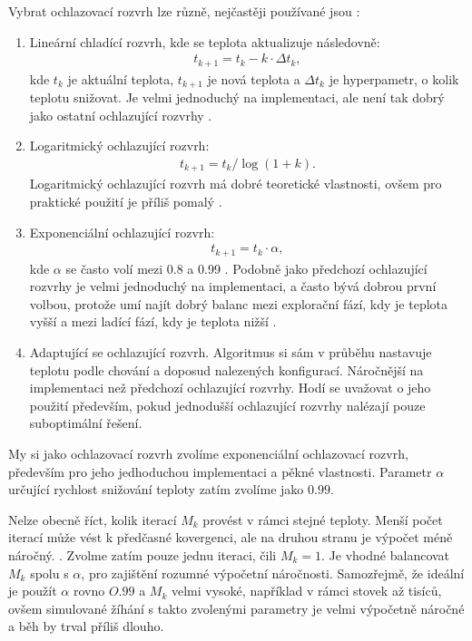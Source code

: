 Vybrat ochlazovací rozvrh lze různě, nejčastěji používané jsou \cite{sa_theory}:
\begin{enumerate}
  \item Lineární chladící rozvrh, kde se teplota aktualizuje následovně:
    \begin{align*}
      t_{k+1} = t_k - k \cdot \Delta t_k,
    \end{align*}
    kde $t_k$ je aktuální teplota, $t_{k+1}$ je nová teplota a $\Delta t_k$ je hyperpametr, o kolik teplotu snižovat.
    Je velmi jednoduchý na implementaci, ale není tak dobrý jako ostatní ochlazující rozvrhy \cite{sa_schedules}.

  \item Logaritmický ochlazující rozvrh:
    \begin{align*}
      t_{k+1} = t_{k} / \log(1 + k).
    \end{align*}
    Logaritmický ochlazující rozvrh má dobré teoretické vlastnosti, ovšem pro praktické použití je příliš pomalý \cite{sa_schedules}.

  \item Exponenciální ochlazující rozvrh:
    \begin{align*}
      t_{k+1} = t_k \cdot \alpha,
    \end{align*}
    kde $\alpha$ se často volí mezi 0.8 a 0.99 \cite{sa_theory}.
    Podobně jako předchozí ochlazující rozvrhy je velmi jednoduchý na implementaci, a často bývá dobrou první volbou, protože umí najít dobrý balanc mezi explorační fází,
    kdy je teplota vyšší a mezi ladící fází, kdy je teplota nižší \cite{sa_theory}.

  \item Adaptující se ochlazující rozvrh. Algoritmus si sám v průběhu nastavuje teplotu podle chování a doposud nalezených konfigurací.
    Náročnější na implementaci než předchozí ochlazující rozvrhy. Hodí se uvažovat o jeho použití především, pokud jednodušší ochlazující rozvrhy nalézají pouze suboptimální řešení.
\end{enumerate}

My si jako ochlazovací rozvrh zvolíme exponenciální ochlazovací rozvrh, především pro jeho jedhoduchou implementaci a pěkné vlastnosti.
Parametr $\alpha$ určující rychlost snižování teploty zatím zvolíme jako $0.99$.

Nelze obecně říct, kolik iterací $M_k$ provést v rámci stejné teploty. Menší počet iterací může vést k předčasné kovergenci, ale na druhou stranu je výpočet méně náročný. \cite{sa_theory}. 
Zvolme zatím pouze jednu iteraci, čili $M_k = 1$.
Je vhodné balancovat $M_k$ spolu s $\alpha$, pro zajištění rozumné výpočetní náročnosti.
Samozřejmě, že ideální je použít $\alpha$ rovno $O.99$ a $M_k$ velmi vysoké, například v rámci stovek až tisíců, 
ovšem simulované žíhání s takto zvolenými parametry je velmi výpočetně náročné a běh by trval příliš dlouho.

